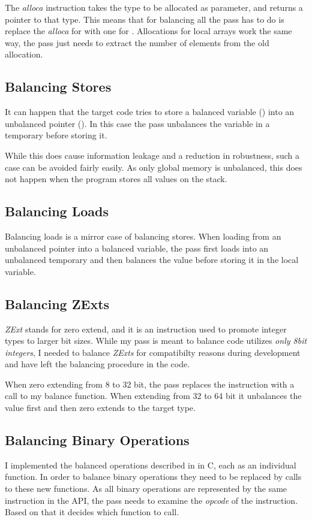 The \emph{alloca} instruction takes the type to be allocated as parameter, and returns a pointer to that type.
This means that for balancing all the pass has to do is replace the \emph{alloca} for  with one for .
Allocations for local arrays work the same way, the pass just needs to extract the number of elements from the old allocation.

\subsection{Balancing Stores}
It can happen that the target code tries to store a balanced variable () into an unbalanced pointer ().
In this case the pass unbalances the variable in a temporary before storing it.

While this does cause information leakage and a reduction in robustness, such a case can be avoided fairly easily.
As only global memory is unbalanced, this does not happen when the program stores all values on the stack.

\subsection{Balancing Loads}
Balancing loads is a mirror case of balancing stores.
When loading from an unbalanced pointer into a balanced variable, the pass first loads into an unbalanced temporary and then balances the value before storing it in the local variable.

\subsection{Balancing ZExts}
\emph{ZExt} stands for zero extend, and it is an instruction used to promote integer types to larger bit sizes.
While my pass is meant to balance code utilizes \emph{only 8bit integers}, I needed to balance \emph{ZExts} for compatibilty reasons during development and have left the balancing procedure in the code.

When zero extending from 8 to 32 bit, the pass replaces the instruction with a call to my balance function.
When extending from 32 to 64 bit it unbalances the value first and then zero extends to the target type.

\subsection{Balancing Binary Operations}
I implemented the balanced operations described in  in C, each as an individual function.
In order to balance binary operations they need to be replaced by calls to these new functions.
As all binary operations are represented by the same instruction in the \llvm{} API, the pass needs to examine the \emph{opcode} of the instruction.
Based on that it decides which function to call.

